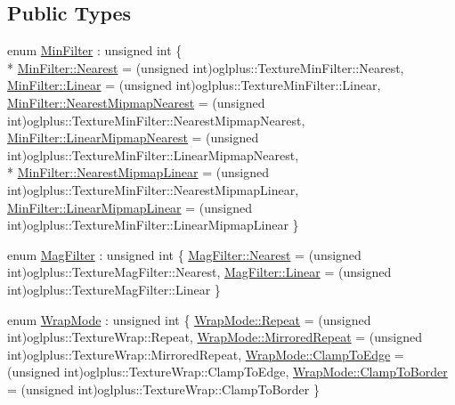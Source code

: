 \subsection*{Public Types}
\begin{DoxyCompactItemize}
\item 
enum \hyperlink{class_o_g_l_texture2_d_a853053ed9bf1c5e1024f947303cb0ec3}{Min\+Filter} \+: unsigned int \{ \\*
\hyperlink{class_o_g_l_texture2_d_a853053ed9bf1c5e1024f947303cb0ec3a60494f02d440f316319dd0fad40ad007}{Min\+Filter\+::\+Nearest} = (unsigned int)oglplus\+:\+:Texture\+Min\+Filter\+:\+:Nearest, 
\hyperlink{class_o_g_l_texture2_d_a853053ed9bf1c5e1024f947303cb0ec3a32a843da6ea40ab3b17a3421ccdf671b}{Min\+Filter\+::\+Linear} = (unsigned int)oglplus\+:\+:Texture\+Min\+Filter\+:\+:Linear, 
\hyperlink{class_o_g_l_texture2_d_a853053ed9bf1c5e1024f947303cb0ec3a35d97e4a37fa3a0d76c692f3e318599b}{Min\+Filter\+::\+Nearest\+Mipmap\+Nearest} = (unsigned int)oglplus\+:\+:Texture\+Min\+Filter\+:\+:Nearest\+Mipmap\+Nearest, 
\hyperlink{class_o_g_l_texture2_d_a853053ed9bf1c5e1024f947303cb0ec3ac164897273ad7f6d61626f5610d86425}{Min\+Filter\+::\+Linear\+Mipmap\+Nearest} = (unsigned int)oglplus\+:\+:Texture\+Min\+Filter\+:\+:Linear\+Mipmap\+Nearest, 
\\*
\hyperlink{class_o_g_l_texture2_d_a853053ed9bf1c5e1024f947303cb0ec3a9a79df5c07e4d2a2875689f608b50529}{Min\+Filter\+::\+Nearest\+Mipmap\+Linear} = (unsigned int)oglplus\+:\+:Texture\+Min\+Filter\+:\+:Nearest\+Mipmap\+Linear, 
\hyperlink{class_o_g_l_texture2_d_a853053ed9bf1c5e1024f947303cb0ec3a1173bd3987b1e185d86b9c3fe1b8bd72}{Min\+Filter\+::\+Linear\+Mipmap\+Linear} = (unsigned int)oglplus\+:\+:Texture\+Min\+Filter\+:\+:Linear\+Mipmap\+Linear
 \}
\item 
enum \hyperlink{class_o_g_l_texture2_d_ad72001307eaec4898b25c749c1857f25}{Mag\+Filter} \+: unsigned int \{ \hyperlink{class_o_g_l_texture2_d_ad72001307eaec4898b25c749c1857f25a60494f02d440f316319dd0fad40ad007}{Mag\+Filter\+::\+Nearest} = (unsigned int)oglplus\+:\+:Texture\+Mag\+Filter\+:\+:Nearest, 
\hyperlink{class_o_g_l_texture2_d_ad72001307eaec4898b25c749c1857f25a32a843da6ea40ab3b17a3421ccdf671b}{Mag\+Filter\+::\+Linear} = (unsigned int)oglplus\+:\+:Texture\+Mag\+Filter\+:\+:Linear
 \}
\item 
enum \hyperlink{class_o_g_l_texture2_d_ac6dae14737ed8643d30026dceebd10cc}{Wrap\+Mode} \+: unsigned int \{ \hyperlink{class_o_g_l_texture2_d_ac6dae14737ed8643d30026dceebd10cca7020426cfb0a204051be4b3053d2acc8}{Wrap\+Mode\+::\+Repeat} = (unsigned int)oglplus\+:\+:Texture\+Wrap\+:\+:Repeat, 
\hyperlink{class_o_g_l_texture2_d_ac6dae14737ed8643d30026dceebd10cca12ce4a5977988214a6b098b8cb0bf695}{Wrap\+Mode\+::\+Mirrored\+Repeat} = (unsigned int)oglplus\+:\+:Texture\+Wrap\+:\+:Mirrored\+Repeat, 
\hyperlink{class_o_g_l_texture2_d_ac6dae14737ed8643d30026dceebd10cca74556551231333c36debc3d373261134}{Wrap\+Mode\+::\+Clamp\+To\+Edge} = (unsigned int)oglplus\+:\+:Texture\+Wrap\+:\+:Clamp\+To\+Edge, 
\hyperlink{class_o_g_l_texture2_d_ac6dae14737ed8643d30026dceebd10ccafb07f88f6f11cc5ab9c951290716f147}{Wrap\+Mode\+::\+Clamp\+To\+Border} = (unsigned int)oglplus\+:\+:Texture\+Wrap\+:\+:Clamp\+To\+Border
 \}
\end{DoxyCompactItemize}
